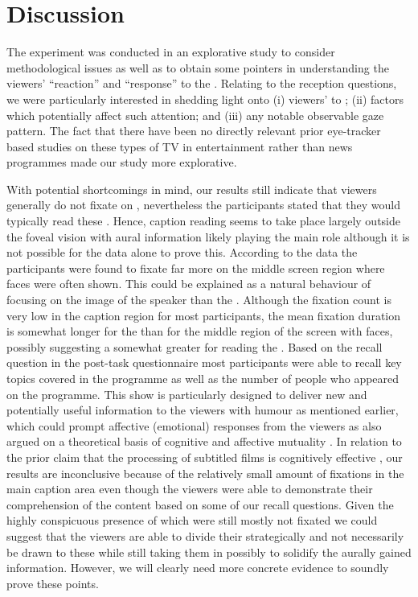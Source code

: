 \documentclass[output=paper]{langsci/langscibook}
\begin{document}
\section{Discussion}

The  experiment was conducted in an explorative study to consider methodological issues as well as to obtain some pointers in understanding the viewers' ``reaction'' and ``response'' to the . Relating to the reception questions, we were particularly interested in shedding light onto (i) viewers'  to ; (ii) factors which potentially affect such attention; and (iii) any notable observable gaze pattern. The fact that there have been no directly relevant prior eye-tracker based studies on these types of TV  in entertainment rather than news programmes made our study more explorative. 


\largerpage
With potential shortcomings in mind, our results still indicate that viewers generally do not fixate on , nevertheless the participants stated that they would typically read these .  Hence, caption reading seems to take place largely outside the foveal vision with aural information likely playing the main role although it is not possible for the  data alone to prove this. According to the  data the participants were found to fixate far more on the middle screen region where faces were often shown. This could be explained as a natural behaviour of focusing on the image of the speaker than the . Although the fixation count is very low in the caption region for most participants, the mean fixation duration is somewhat longer for the  than for the middle region of the screen with faces, possibly suggesting a somewhat greater  for reading the . Based on the recall question in the post-task questionnaire most participants were able to recall key topics covered in the programme as well as the number of people who appeared on the programme. This show is particularly designed to deliver new and potentially useful information to the viewers with humour as mentioned earlier, which could prompt affective (emotional) responses from the viewers as also argued on a theoretical basis of cognitive and affective mutuality \citep{Shiota2003, Sasamoto2014}. In relation to the prior claim that the processing of subtitled films is cognitively effective \citep{perego2010}, our results are inconclusive because of the relatively small amount of fixations in the main caption area even though the viewers were able to demonstrate their comprehension of the content based on some of our recall questions.  Given the highly conspicuous presence of  which were still mostly not fixated we could suggest that the viewers are able to divide their  strategically and not necessarily be drawn to these  while still taking them in possibly to solidify the aurally gained information.  However, we will clearly need more concrete evidence to soundly prove these points. 
\end{document}
